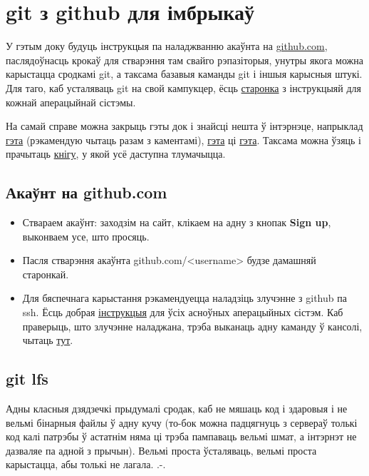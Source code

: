 \documentclass[12pt, a4paper]{extarticle}
\begin{document}
    \section{git з github для імбрыкаў}
    У гэтым доку будуць інструкцыя па наладжванню акаўнта на \href{https://github.com/}{github.com}, паслядоўнасць крокаў для стварэння там свайго рэпазіторыя, унутры якога можна карыстацца сродкамі git, а таксама базавыя каманды git і іншыя карысныя штукі. Для таго, каб усталяваць git на свой кампукцер, ёсць \href{https://git-scm.com/book/en/v2/Getting-Started-Installing-Git}{старонка} з інструкцыяй для кожнай аперацыйнай сістэмы.
    
    На самай справе можна закрыць гэты док і знайсці нешта ў інтэрнэце, напрыклад \href{https://habr.com/ru/post/125799/}{гэта} (рэкамендую чытаць разам з каментамі), \href{https://www.tutorialspoint.com/git/index.htm}{гэта} ці \href{https://githowto.com}{гэта}. Таксама можна ўзяць і прачытаць \href{https://git-scm.com/book/en/v1/}{кнігу}, у якой усё даступна тлумачыцца.
    
    \subsection{Акаўнт на github.com}
    \begin{itemize}    
        \item Ствараем акаўнт: заходзім на сайт, клікаем на адну з кнопак \textbf{Sign up}, выконваем усе, што просяць.
        \item Пасля стварэння акаўнта github.com/<username> будзе дамашняй старонкай.
        \item Для бяспечнага карыстання рэкамендуецца наладзіць злучэнне з github па ssh. Ёсць добрая \href{https://help.github.com/en/articles/generating-a-new-ssh-key-and-adding-it-to-the-ssh-agent}{інструкцыя} для ўсіх асноўных аперацыйных сістэм. Каб праверыць, што злучэнне наладжана, трэба выканаць адну каманду ў кансолі, чытаць \href{https://help.github.com/en/articles/testing-your-ssh-connection}{тут}.
    \end{itemize}
    
    \subsection{git lfs}
    Адны класныя дзядзечкі прыдумалі сродак, каб не мяшаць код і здаровыя і не вельмі бінарныя файлы ў адну кучу (то-бок можна падцягнуць з сервераў толькі код калі патрэбы ў астатнім няма ці трэба пампаваць вельмі шмат, а інтэрнэт не дазваляе па адной з прычын). Вельмі проста ўсталяваць, вельмі проста карыстацца, абы толькі не лагала. .-.
    
\end{document}
